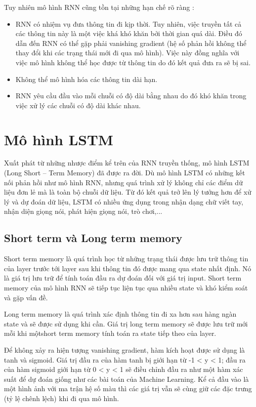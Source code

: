 Tuy nhiên mô hình RNN cũng tồn tại những hạn chế rõ ràng \cite{web:5}:
\begin{itemize}
	\item RNN có nhiệm vụ đưa thông tin đi kịp thời. Tuy nhiên, việc truyền tất cả các thông tin này là một việc khá khó khăn bởi thời gian quá dài. Điều đó dẫn đến RNN có thể gặp phải vanishing gradient (hệ số phản hồi không thể thay đổi khi các trạng thái mới đi qua mô hình). Việc này đồng nghĩa với việc mô hình không thể học được từ thông tin do đó kết quả đưa ra sẽ bị sai.
	\item Không thể mô hình hóa các thông tin dài hạn.
	\item RNN yêu cầu đầu vào mỗi chuỗi có độ dài bằng nhau do đó khó khăn trong việc xử lý các chuỗi có độ dài khác nhau. 
\end{itemize}

\newpage
\section{Mô hình LSTM}
Xuất phát từ những nhược điểm kể trên của RNN truyền thống, mô hình LSTM (Long Short – Term Memory) đã được ra đời. Dù mô hình LSTM có những kết nối phản hồi như mô hình RNN, nhưng quá trình xử lý không chỉ các điểm dữ liệu đơn lẻ mà là toàn bộ chuỗi dữ liệu. Từ đó kết quả trở lên lý tưởng hơn để xử lý và dự đoán dữ liệu, LSTM có nhiều ứng dụng trong nhận dạng chữ viết tay, nhận diện giọng nói, phát hiện giọng nói, trò chơi,...\cite{hochreiter1997long}

\subsection{Short term và Long term memory}
Short term memory là quá trình học từ những trạng thái được lưu trữ thông tin của layer trước tới layer sau khi thông tin đó được mang qua state nhất định. Nó là giá trị lưu trữ để tính toán đầu ra dự đoán đối với giá trị input. Short term memory của mô hình RNN sẽ tiếp tục liện tục qua nhiều state và khó kiểm soát và gặp vấn đề.

Long term memory là quá trình xác định thông tin đi xa hơn sau hàng ngàn state và sẽ được sử dụng khi cần. Giá trị long term memory sẽ được lưu trữ mới mỗi khi mộtshort term memory tính toán ra state tiếp theo của layer.

Để không xảy ra hiện tượng vanishing gradient, hàm kích hoạt được sử dụng là tanh và sigmoid. Giá trị đầu ra của hàm tanh bị giới hạn từ -1 < y < 1; đầu ra của hàm sigmoid giới hạn từ 0 < y < 1 sẽ điều chỉnh đầu ra như một hàm xác suất để dự đoán giống như các bài toán của Machine Learning. Kể cả đầu vào là một hình ảnh với ma trận hệ số màu thì các giá trị vẫn sẽ cùng giữ các đặc trưng (tỷ lệ chênh lệch) khi đi qua mô hình.

